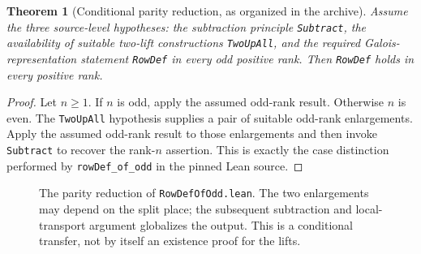 \documentclass[11pt,openany,oneside]{scrbook}
\newtheorem{theorem}{Theorem}[chapter]
\theoremstyle{definition}
\theoremstyle{remark}
\begin{document}
\begin{theorem}[Conditional parity reduction, as organized in the archive]\label{thm:parity}
Assume the three source-level hypotheses: the subtraction principle \texttt{Subtract}, the availability of suitable two-lift constructions \texttt{TwoUpAll}, and the required Galois-representation statement \texttt{RowDef} in every odd positive rank. Then \texttt{RowDef} holds in every positive rank.
\end{theorem}
\begin{proof}
Let $n\ge1$. If $n$ is odd, apply the assumed odd-rank result. Otherwise $n$ is even. The \texttt{TwoUpAll} hypothesis supplies a pair of suitable odd-rank enlargements. Apply the assumed odd-rank result to those enlargements and then invoke \texttt{Subtract} to recover the rank-$n$ assertion. This is exactly the case distinction performed by \texttt{rowDef\_of\_odd} in the pinned Lean source.
\end{proof}

\begin{figure}[ht]
\centering
{}
\caption{The parity reduction of \texttt{RowDefOfOdd.lean}. The two enlargements may depend on the split place; the subsequent subtraction and local-transport argument globalizes the output. This is a conditional transfer, not by itself an existence proof for the lifts.}
\end{figure}
\end{document}
